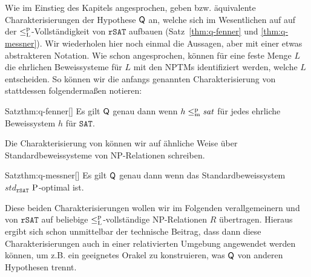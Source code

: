 Wie im Einstieg des Kapitels angesprochen, geben \textcite{fenner_inverting_2003} bzw. \textcite{kobler_is_2000} äquivalente Charakterisierungen der Hypothese $\hQ$ an, welche sich im Wesentlichen auf auf der $\leqlp$-Vollständigkeit von $\mathtt{rSAT}$ aufbauen (Satz~\ref{thm:q-fenner} und \ref{thm:q-messner}).
Wir wiederholen hier noch einmal die Aussagen, aber mit einer etwas abstrakteren Notation.
Wie schon angesprochen, können für eine feste Menge $L$ die ehrlichen Beweissysteme für $L$ mit den NPTMs identifiziert werden, welche $L$ entscheiden.
So können wir die anfangs genannten Charakterisierung von \citeauthor{fenner_inverting_2003} stattdessen folgendermaßen notieren:
\begin{reptheorem}{Satz}{thm:q-fenner}[\cite{fenner_inverting_2003}]
    Es gilt $\hQ$ genau dann wenn $h\leqmp\mathit{sat}$ für jedes ehrliche Beweissystem $h$ für $\mathtt{SAT}$. 
\end{reptheorem}
Die Charakterisierung von \citeauthor{kobler_is_2000} können wir auf ähnliche Weise über Standardbeweissysteme von NP-Relationen schreiben.
\begin{reptheorem}{Satz}{thm:q-messner}[\cite{kobler_is_2000}]
    Es gilt $\hQ$ genau dann wenn das Standardbeweissystem $\mathit{std}_\mathtt{rSAT}$ $\P$-optimal ist.
\end{reptheorem}

Diese beiden Charakterisierungen wollen wir im Folgenden verallgemeinern und von $\mathtt{rSAT}$ auf beliebige $\leqlp$-vollständige NP-Relationen $R$ übertragen. 
Hieraus ergibt sich schon unmittelbar der technische Beitrag, dass dann diese Charakterisierungen auch in einer relativierten Umgebung angewendet werden können, um z.B. ein geeignetes Orakel zu konstruieren, was $\hQ$ von anderen Hypothesen trennt.

